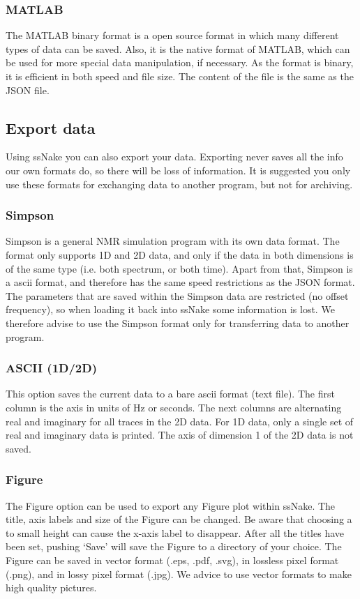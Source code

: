 \documentclass[11pt,a4paper]{article}
\begin{document}
\subsubsection*{MATLAB}
The MATLAB binary format is a open source format in which many different types of data can be saved. Also, it is the native format of MATLAB, which can be used for more special data manipulation, if necessary. As the format is binary, it is efficient in both speed and file size. The content of the file is the same as the JSON file.


\subsection{Export data}
Using ssNake you can also export your data. Exporting never saves all the info our own formats do, so there will be loss of information. It is suggested you only use these formats for exchanging data to another program, but not for archiving.


\subsubsection*{Simpson}
Simpson is a general NMR simulation program with its own data format. The format only supports 1D and 2D data, and only if the data in both dimensions is of the same type (i.e. both spectrum, or both time). Apart from that, Simpson is a ascii format, and therefore has the same speed restrictions as the JSON format. The parameters that are saved within the Simpson data are restricted (no offset frequency), so when loading it back into ssNake some information is lost. We therefore advise to use the Simpson format only for transferring data to another program.

\subsubsection*{ASCII (1D/2D)}
This option saves the current data to a bare ascii format (text file). The first column is the axis in units of Hz or seconds. The next columns are alternating real and imaginary for all traces in the 2D data. For 1D data, only a single set of real and imaginary data is printed. The axis of dimension 1 of the 2D data is not saved.

\subsubsection*{Figure}
The Figure option can be used to export any Figure plot within ssNake. The title, axis labels and size of the Figure can be changed. Be aware that choosing a to small height can cause the x-axis label to disappear. After all the titles have been set, pushing `Save' will save the Figure to a directory of your choice. The Figure can be saved in vector format (.eps, .pdf, .svg), in lossless pixel format (.png), and in lossy pixel format (.jpg). We advice to use vector formats to make high quality pictures.
\end{document}
